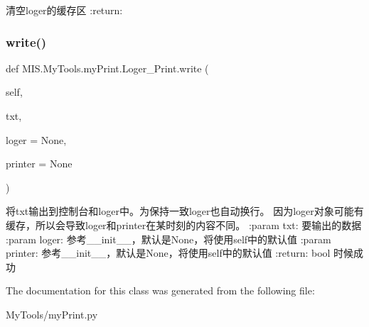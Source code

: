 \begin{DoxyVerb}清空loger的缓存区
:return:
\end{DoxyVerb}
 \mbox{\label{classMIS_1_1MyTools_1_1myPrint_1_1Loger__Print_a5336ec6cc8b36a4efce0f95f64897194}} 
\subsubsection{\texorpdfstring{write()}{write()}}
{\footnotesize\ttfamily def M\+I\+S.\+My\+Tools.\+my\+Print.\+Loger\+\_\+\+Print.\+write (\begin{DoxyParamCaption}\item[{}]{self,  }\item[{}]{txt,  }\item[{}]{loger = {\ttfamily None},  }\item[{}]{printer = {\ttfamily None} }\end{DoxyParamCaption})}

\begin{DoxyVerb}将txt输出到控制台和loger中。为保持一致loger也自动换行。
因为loger对象可能有缓存，所以会导致loger和printer在某时刻的内容不同。
:param txt: 要输出的数据
:param loger: 参考__init__，默认是None，将使用self中的默认值
:param printer: 参考__init__，默认是None，将使用self中的默认值
:return: bool 时候成功
\end{DoxyVerb}
 

The documentation for this class was generated from the following file\+:\begin{DoxyCompactItemize}
\item 
My\+Tools/my\+Print.\+py\end{DoxyCompactItemize}
